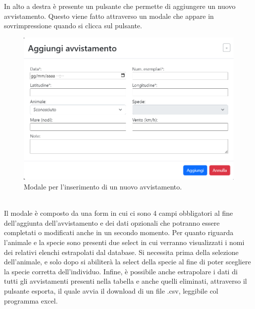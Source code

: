 \documentclass[a4paper,final,12pt]{report}
\begin{document}
In alto a destra è presente un pulsante che permette di aggiungere un nuovo avvistamento. Questo viene fatto attraverso un modale che appare in sovrimpressione quando si clicca sul pulsante.
\begin{figure}[hbtp]
\centering
\includegraphics[scale=0.50]{img_concettuale/aggiungiAvv.png}
\caption{Modale per l'inserimento di un nuovo avvistamento.}
\end{figure}
\\ Il modale è composto da una form in cui ci sono 4 campi obbligatori al fine dell'aggiunta dell'avvistamento e dei dati opzionali che potranno essere completati o modificati anche in un secondo momento. Per quanto riguarda l'animale e la specie sono presenti due select in cui verranno visualizzati i nomi dei relativi elenchi estrapolati dal database. Si necessita prima della selezione dell'animale, e solo dopo si abiliterà la select della specie al fine di poter scegliere la specie corretta dell'individuo.
Infine, è possibile anche estrapolare i dati di tutti gli avvistamenti presenti nella tabella e anche quelli eliminati, attraverso il pulsante esporta, il quale avvia il download di un file .csv, leggibile col programma excel. 
\end{document}
